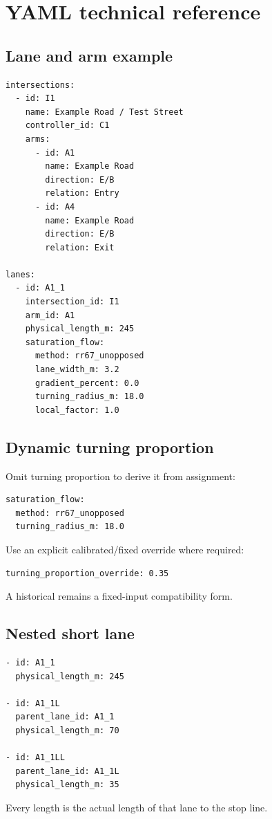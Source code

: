 \chapter{YAML technical reference}
\label{app:yaml}

\section{Lane and arm example}
\begin{verbatim}
intersections:
  - id: I1
    name: Example Road / Test Street
    controller_id: C1
    arms:
      - id: A1
        name: Example Road
        direction: E/B
        relation: Entry
      - id: A4
        name: Example Road
        direction: E/B
        relation: Exit

lanes:
  - id: A1_1
    intersection_id: I1
    arm_id: A1
    physical_length_m: 245
    saturation_flow:
      method: rr67_unopposed
      lane_width_m: 3.2
      gradient_percent: 0.0
      turning_radius_m: 18.0
      local_factor: 1.0
\end{verbatim}

\section{Dynamic turning proportion}
Omit turning proportion to derive it from assignment:
\begin{verbatim}
saturation_flow:
  method: rr67_unopposed
  turning_radius_m: 18.0
\end{verbatim}

Use an explicit calibrated/fixed override where required:
\begin{verbatim}
turning_proportion_override: 0.35
\end{verbatim}

A historical  remains a fixed-input compatibility form.

\section{Nested short lane}
\begin{verbatim}
- id: A1_1
  physical_length_m: 245

- id: A1_1L
  parent_lane_id: A1_1
  physical_length_m: 70

- id: A1_1LL
  parent_lane_id: A1_1L
  physical_length_m: 35
\end{verbatim}
Every length is the actual length of that lane to the stop line.

